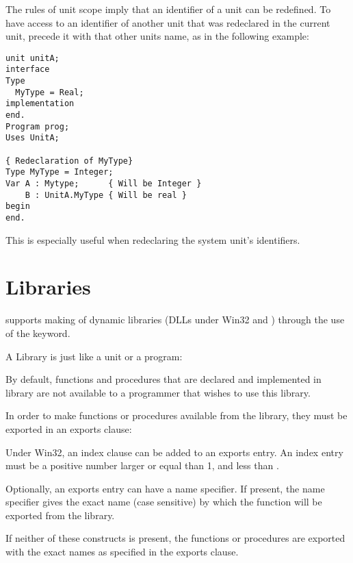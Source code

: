 The rules of unit scope imply that an identifier of a unit can be redefined. 
To have access to an identifier of another unit that was redeclared in
the current unit, precede it with that other units name, as in the following
example:
\begin{verbatim}
unit unitA;
interface
Type
  MyType = Real;
implementation
end.
Program prog;
Uses UnitA;

{ Redeclaration of MyType}
Type MyType = Integer;
Var A : Mytype;      { Will be Integer }
    B : UnitA.MyType { Will be real }
begin
end.
\end{verbatim}
This is especially useful when redeclaring the system unit's identifiers.

\section{Libraries}
 

\fpc supports making of dynamic libraries (DLLs under Win32 and \ostwo) through
the use of the  keyword.

A Library is just like a unit or a program:


By default, functions and procedures that are declared and implemented in
library are not available to a programmer that wishes to use this library.

In order to make functions or procedures available from the library,
they must be exported in an exports clause:



Under Win32, an index clause can be added to an exports entry.
An index entry must be a positive number larger or equal than 1, and less
than .

Optionally, an exports entry can have a name specifier. If present, the name
specifier gives the exact name (case sensitive) by which the function will
be exported from the library.

If neither of these constructs is present, the functions or procedures
are exported with the exact names as specified in the exports clause.

